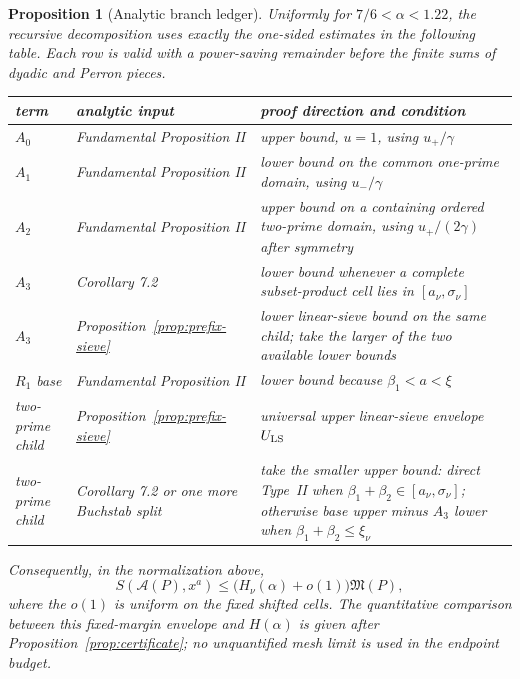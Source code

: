 \documentclass[10pt,reqno]{amsart}
\newcommand{\Acal}{\mathcal{A}}
\newcommand{\1}{\mathbf{1}}
\theoremstyle{plain}
\newtheorem{proposition}[theorem]{Proposition}
\theoremstyle{remark}
\begin{document}
\begin{proposition}[Analytic branch ledger]\label{prop:branch-ledger}
Uniformly for $7/6<\alpha<1.22$, the recursive decomposition uses exactly
the one-sided estimates in the following table.  Each row is valid with a
power-saving remainder before the finite sums of dyadic and Perron pieces.

\begin{center}
\small
\renewcommand{\arraystretch}{1.12}
\begin{tabular}{|>{\raggedright\arraybackslash}p{}|
>{\raggedright\arraybackslash}p{}|
>{\raggedright\arraybackslash}p{}|}
\hline
term & analytic input & proof direction and condition \\
\hline
$A_0$ & Fundamental Proposition II & upper bound, $u=1$, using
$u_+/\gamma$ \\
\hline
$A_1$ & Fundamental Proposition II & lower bound on the common one-prime
domain, using $u_-/\gamma$ \\
\hline
$A_2$ & Fundamental Proposition II & upper bound on a containing ordered
two-prime domain, using $u_+/(2\gamma)$ after symmetry \\
\hline
$A_3$ & Corollary 7.2 & lower bound whenever a complete subset-product cell
lies in $[a_\nu,\sigma_\nu]$ \\
\hline
$A_3$ & Proposition~\ref{prop:prefix-sieve} & lower linear-sieve bound on
the same child; take the larger of the two available lower bounds \\
\hline
$R_1$ base & Fundamental Proposition II & lower bound because
$\beta_1<a<\xi$ \\
\hline
two-prime child & Proposition~\ref{prop:prefix-sieve} & universal upper
linear-sieve envelope $U_{\rm LS}$ \\
\hline
two-prime child & Corollary 7.2 or one more Buchstab split & take the smaller
upper bound: direct Type~II when $\beta_1+\beta_2\in[a_\nu,\sigma_\nu]$;
otherwise base upper minus $A_3$ lower when
$\beta_1+\beta_2\le\xi_\nu$ \\
\hline
\end{tabular}
\end{center}

Consequently, in the normalization above,
\[
 S(\Acal(P),x^a)
 \le \bigl(H_\nu(\alpha)+o(1)\bigr)\mathfrak M(P),
\]
where the $o(1)$ is uniform on the fixed shifted cells.  The quantitative
comparison between this fixed-margin envelope and $H(\alpha)$ is given
after Proposition~\ref{prop:certificate}; no unquantified mesh limit is used
in the endpoint budget.
\end{proposition}
\end{document}
